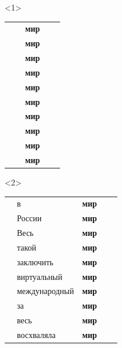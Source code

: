 \documentclass[10pt, compress]{beamer}
\begin{document}
\begin{frame}

\begin{center}
\begin{onlyenv}<1>
\begin{tabular}{p{2.5cm}p{2.5cm}p{1.0cm}p{2.5cm}p{1.0cm}}
      &     &  \textbf{мир}  &      &      \\
      &     &  \textbf{мир}  &      &     \\
      &     &  \textbf{мир}  &      &     \\
      &     &  \textbf{мир}  &      &      \\
      &     &  \textbf{мир}  &      &      \\
      &     &  \textbf{мир}  &      &      \\
      &     &  \textbf{мир}  &      &      \\
      &     &  \textbf{мир}  &      &      \\
      &     &  \textbf{мир}  &      &      \\
      &     &  \textbf{мир}  &      &      \\
\end{tabular}
\end{onlyenv}
\begin{onlyenv}<2>
\begin{tabular}{p{2.5cm}p{2.5cm}p{1.0cm}p{2.5cm}p{1.0cm}}
      & в    &  \textbf{мир}  &      &      \\
      & России    &  \textbf{мир}  &      & \\
      & Весь    &  \textbf{мир}  &      &      \\
      & такой    &  \textbf{мир}  &      &     \\
      & заключить    &  \textbf{мир}  &      &      \\
      & виртуальный    &  \textbf{мир}  &      &      \\
      & международный    &  \textbf{мир}  &      &      \\
      & за    &  \textbf{мир}  &      &      \\
      & весь    &  \textbf{мир}  &      &      \\
      & восхваляла    &  \textbf{мир}  &      &      \\
\end{tabular}


\end{onlyenv}
\end{center}
\end{frame}
\end{document}
